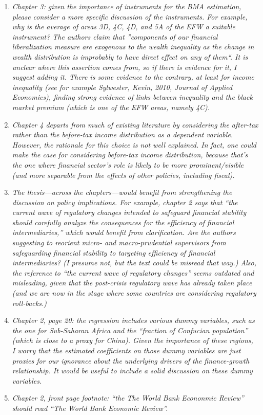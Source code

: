 \begin{enumerate}
    \item \textit{Chapter 3: given the importance of instruments for the BMA estimation, please consider a more specific discussion of the instruments. For example, why is the average of areas 3D, 4C, 4D, and 5A of the EFW a suitable instrument? The authors claim that ''components of our financial liberalization measure are exogenous to the wealth inequality as the change in wealth distribution is improbably to have direct effect on any of them``. It is unclear where this assertion comes from, so if there is evidence for it, I suggest adding it. There is some evidence to the contrary, at least for income inequality (see for example Sylwester, Kevin, 2010, Journal of Applied Economics), finding strong evidence of links between inequality and the black market premium (which is one of the EFW areas, namely 4C).}
    
    \item \textit{Chapter 4 departs from much of existing literature by considering the after-tax rather than the before-tax income distribution as a dependent variable. However, the rationale for this choice is not well explained. In fact, one could make the case for considering before-tax income distribution, because that’s the one where financial sector’s role is likely to be more prominent/visible (and more separable from the effects of other policies, including fiscal).}
    
    \item \textit{The thesis—across the chapters—would benefit from strengthening the discussion on policy implications. For example, chapter 2 says that ``the current wave of regulatory changes intended to safeguard financial stability should carefully analyze the consequences for the efficiency of financial intermediaries,'' which would benefit from clarification. Are the authors suggesting to reorient micro- and macro-prudential supervisors from safeguarding financial stability to targeting efficiency of financial intermediaries? (I presume not, but the text could be misread that way.) Also, the reference to ``the current wave of regulatory changes'' seems outdated and misleading, given that the post-crisis regulatory wave has already taken place (and we are now in the stage where some countries are considering regulatory roll-backs.)}

    \item \textit{Chapter 2, page 20: the regression includes various dummy variables, such as the one for Sub-Saharan Africa and the ``fraction of Confucian population'' (which is close to a proxy for China). Given the importance of these regions, I worry that the estimated coefficients on those dummy variables are just proxies for our ignorance about the underlying drivers of the finance-growth relationship. It would be useful to include a solid discussion on these dummy variables.}

    \item \textit{Chapter 2, front page footnote: ``the The World Bank Econonmic Review'' should read ``The World Bank Economic Review''.}
\end{enumerate} 